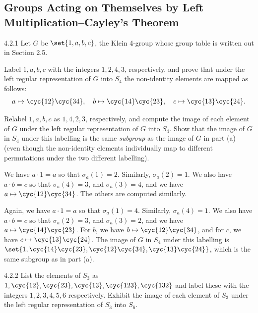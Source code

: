 \subsection{Groups Acting on Themselves by Left Multiplication--Cayley's Theorem}

\begin{exercise}{4.2.1}
	Let $G$ be $\set{1,a,b,c}$, the Klein 4-group whose group table is written out in Section 2.5.
	\begin{subexercises}
		\item Label $1,a,b,c$ with the integers $1,2,4,3$, respectively, and prove that under the left regular representation of $G$ into $S_4$ the non-identity elements are mapped as follows:
		\[
			a \mapsto \cyc{1 2}\cyc{3 4}, \quad b \mapsto \cyc{1 4}\cyc{2 3}, \quad c \mapsto \cyc{1 3}\cyc{2 4}.
		\]
		\item Relabel $1,a,b,c$ as $1,4,2,3$, respectively, and compute the image of each element of $G$ under the left regular representation of $G$ into $S_4$.
		Show that the image of $G$ in $S_4$ under this labelling is the same \emph{subgroup} as the image of $G$ in part (a) (even though the non-identity elements individually map to different permutations under the two different labelling).
	\end{subexercises}
\end{exercise}

\begin{solenum}
	\item We have $a \cdot 1 = a$ so that $\sigma_a(1) = 2$.
	Similarly, $\sigma_a(2) = 1$.
	We also have $a \cdot b = c$ so that $\sigma_a(4) = 3$, and $\sigma_a(3) = 4$, and we have $a \mapsto \cyc{1 2}\cyc{3 4}$.
	The others are computed similarly. 
	\item Again, we have $a \cdot 1 = a$ so that $\sigma_a(1) = 4$.
	Similarly, $\sigma_a(4) = 1$.
	We also have $a \cdot b = c$ so that $\sigma_a(2) = 3$, and $\sigma_a(3) = 2$, and we have $a \mapsto \cyc{1 4}\cyc{2 3}$.
	For $b$, we have $b \mapsto \cyc{1 2}\cyc{3 4}$, and for $c$, we have $c \mapsto \cyc{1 3}\cyc{2 4}$.
	The image of $G$ in $S_4$ under this labelling is $\set{1, \cyc{1 4}\cyc{2 3}, \cyc{1 2}\cyc{3 4}, \cyc{1 3}\cyc{2 4}}$, which is the same subgroup as in part (a).
\end{solenum}

\begin{exercise}{4.2.2}
	List the elements of $S_3$ as $1, \cyc{1 2}, \cyc{2 3}, \cyc{1 3}, \cyc{1 2 3}, \cyc{1 3 2}$ and label these with the integers $1,2,3,4,5,6$ respectively.
	Exhibit the image of each element of $S_3$ under the left regular representation of $S_3$ into $S_6$.
\end{exercise}

